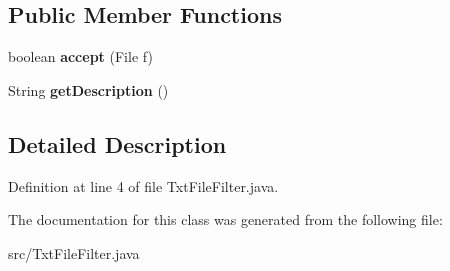 \subsection*{Public Member Functions}
\begin{DoxyCompactItemize}
\item 
\hypertarget{class_txt_file_filter_a64c80c6f6243b37a6bd3ca80ba2c929d}{boolean {\bfseries accept} (File f)}\label{class_txt_file_filter_a64c80c6f6243b37a6bd3ca80ba2c929d}

\item 
\hypertarget{class_txt_file_filter_a7a3381d673060728cddb1c89bbd0d750}{String {\bfseries get\-Description} ()}\label{class_txt_file_filter_a7a3381d673060728cddb1c89bbd0d750}

\end{DoxyCompactItemize}


\subsection{Detailed Description}


Definition at line 4 of file Txt\-File\-Filter.\-java.



The documentation for this class was generated from the following file\-:\begin{DoxyCompactItemize}
\item 
src/Txt\-File\-Filter.\-java\end{DoxyCompactItemize}
